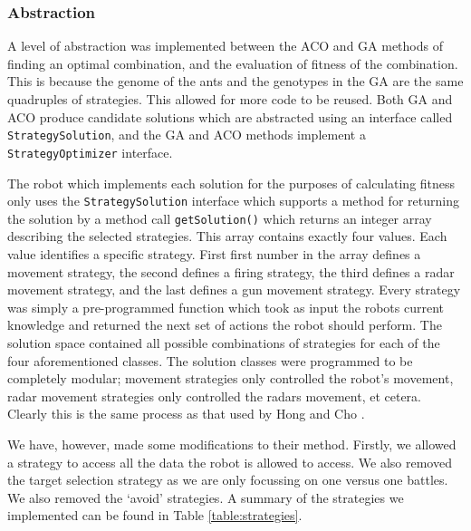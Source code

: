 

\subsubsection{Abstraction}
A level of abstraction was implemented between the ACO and GA methods of finding an optimal combination, and the evaluation of fitness of the combination. This is because the genome of the ants and the genotypes in the GA are the same quadruples of strategies. This allowed for more code to be reused. Both GA and ACO produce candidate solutions which are abstracted using an interface called \texttt{StrategySolution}, and the GA and ACO methods implement a \texttt{StrategyOptimizer} interface.

The robot which implements each solution for the purposes of calculating fitness only uses the \texttt{StrategySolution} interface which supports a method for returning the solution by a method call \texttt{getSolution()} which returns an integer array describing the selected strategies. This array contains exactly four values. Each value identifies a specific strategy. First first number in the array defines a movement strategy, the second defines a firing strategy, the third defines a radar movement strategy, and the last defines a gun movement strategy. Every strategy was simply a pre-programmed function which took as input the robots current knowledge and returned the next set of actions the robot should perform. The solution space contained all possible combinations of strategies for each of the four aforementioned classes. The solution classes were programmed to be completely modular; movement strategies only controlled the robot's movement, radar movement strategies only controlled the radars movement, et cetera. Clearly this is the same process as that used by Hong and Cho \cite{emergentbehaviours}. 

We have, however, made some modifications to their method. Firstly, we allowed a strategy to access all the data the robot is allowed to access. We also removed the target selection strategy as we are only focussing on one versus one battles. We also removed the `avoid' strategies. A summary of the strategies we implemented can be found in Table \ref{table:strategies}.


